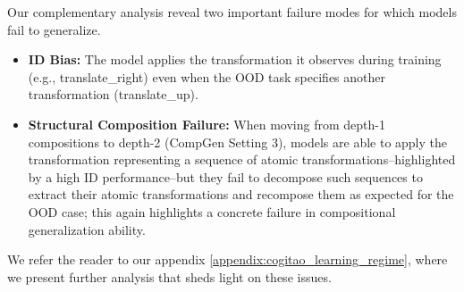 Our complementary analysis reveal two important failure modes for which models fail to generalize. 

\begin{itemize}
    \item \textbf{ID Bias:} The model applies the transformation it observes during training (e.g., translate\_right) even when the OOD task specifies another transformation (translate\_up).
    \item \textbf{Structural Composition Failure:} When moving from depth-1 compositions to depth-2 (CompGen Setting 3), models are able to apply the transformation representing a sequence of atomic transformations–highlighted by a high ID performance–but they fail to decompose such sequences to extract their atomic transformations and recompose them as expected for the OOD case; this again highlights a concrete failure in compositional generalization ability.
\end{itemize}

We refer the reader to our appendix \ref{appendix:cogitao_learning_regime}, where we present further analysis that sheds light on these issues.





